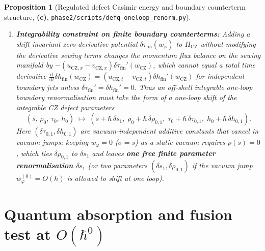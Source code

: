 \documentclass[11pt,a4paper]{article}
\newcommand{\Lc}{\textsf{\textbf{(c)}}}
\newcommand{\dd}{\mathrm{d}}
\newcommand{\hb}{\hbar}
\newcommand{\sren}{\texttt{phase2/\allowbreak scripts/\allowbreak defq\_\allowbreak oneloop\_\allowbreak renorm.py}}
\newtheorem{proposition}{Proposition}[section]
\theoremstyle{remark}
\begin{document}
\begin{proposition}[Regulated defect Casimir energy and boundary counterterm structure, \Lc, \sren]
\begin{enumerate}
\begin{equation}
  \delta E_D^{\mathrm{ct}}(\sigma_{\mathrm{vac}};\Lambda)
  = -\frac{S_D}{\pi}(T - 1) + \delta E_{D,\mathrm{fin}}(\sigma_{\mathrm{vac}})
  = \frac{\eta\sqrt{3}(T-1)}{2\pi}\big(s + \sqrt{3}\,\eta\,M_D\big) + \delta E_{D,\mathrm{fin}}(\sigma_{\mathrm{vac}}).
\end{equation}
Notice that the $M_D$-dependent part of \eqref{eq:delta_ED_ct},
$+\frac{3(T-1)}{2\pi}M_D = \frac{3(T-1)}{2\pi}(\varphi_R(0^+)-\varphi_L(0^-))$,
is precisely the boundary jump required to complete the open-half-line bulk
integral $\int_{x\ne 0}\varphi_x\,\dd x = (\varphi_R(+\infty)-\varphi_L(-\infty)) - M_D$
into the topological total-derivative counterterm $\frac{3(T-1)}{2\pi}(\varphi_R(+\infty)-\varphi_L(-\infty))$!
\item \textbf{Integrability constraint on finite boundary counterterms:}
Adding a shift-invariant zero-derivative potential $\delta\tau_{\mathrm{fin}}(w_\varphi)$
to $H_{\mathrm{CZ}}$ without modifying the derivative sewing terms changes the
momentum flux balance on the sewing manifold by
$-(u_{\mathrm{CZ},x}-v_{\mathrm{CZ},x})\delta\tau_{\mathrm{fin}}'(w_{\mathrm{CZ}})$,
which cannot equal a total time derivative $\frac{\dd}{\dd t}\delta h_{\mathrm{fin}}(w_{\mathrm{CZ}}) = (u_{\mathrm{CZ},t}-v_{\mathrm{CZ},t})\delta h_{\mathrm{fin}}'(w_{\mathrm{CZ}})$
for independent boundary jets unless $\delta\tau_{\mathrm{fin}}' = \delta h_{\mathrm{fin}}' = 0$.
Thus an off-shell integrable one-loop boundary renormalisation must take the form
of a one-loop shift of the integrable CZ defect parameters
\begin{equation}\label{eq:param_renorm}
  (s,\,\rho_0,\,\tau_0,\,h_0) \;\longmapsto\;
  (s + \hb\,\delta s_1,\;\rho_0 + \hb\,\delta\rho_{0,1},\;\tau_0 + \hb\,\delta\tau_{0,1},\;h_0 + \hb\,\delta h_{0,1}).
\end{equation}
Here $(\delta\tau_{0,1},\delta h_{0,1})$ are vacuum-independent additive constants
that cancel in vacuum jumps; keeping $w_\varphi = 0$ ($\sigma = s$) as a static
vacuum requires $\rho(s)=0$, which ties $\delta\rho_{0,1}$ to $\delta s_1$ and
leaves \textbf{one free finite parameter renormalisation $\delta s_1$} (or two
parameters $(\delta s_1,\delta\rho_{0,1})$ if the vacuum jump $w_\varphi^{(0)} = O(\hb)$
is allowed to shift at one loop).
\end{enumerate}
\end{proposition}

\section{Quantum absorption and fusion test at \texorpdfstring{$O(\hb^0)$}{O(hbar\^0)}}
\label{sec:fusion}
\end{document}
